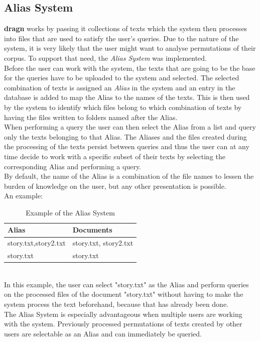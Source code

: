 \subsection{Alias System}
\label{sec:alias}
\textbf{dragn} works by passing it collections of texts which the system then processes into files that are used to satisfy the user's queries. Due to the nature of the system, it is very likely that the user might want to analyse permutations of their corpus. To support that need, the \textit{Alias System} was implemented.\\
Before the user can work with the system, the texts that are going to be the base for the queries have to be uploaded to the system and selected. The selected combination of texts is assigned an \textit{Alias} in the system and an entry in the database is added to map the Alias to the names of the texts. This is then used by the system to identify which files belong to which combination of texts by having the files written to folders named after the Alias.\\
When performing a query the user can then select the Alias from a list and query only the texts belonging to that Alias. The Aliases and the files created during the processing of the texts persist between queries and thus the user can at any time decide to work with a specific subset of their texts by selecting the corresponding Alias and performing a query.\\
By default, the name of the Alias is a combination of the file names to lessen the burden of knowledge on the user, but any other presentation is possible.\\
An example:
\begin{table}[h!]
\centering
\caption{Example of the Alias System}
\label{table:alias-example}
\begin{tabular}{l|l}
Alias & Documents \\ \hline
story.txt,story2.txt & story.txt, story2.txt \\
story.txt & story.txt
\end{tabular}
\end{table}
\\
In this example, the user can select "story.txt" as the Alias and perform queries on the processed files of the document "story.txt" without having to make the system process the text beforehand, because that has already been done.\\
The Alias System is especially advantageous when multiple users are working with the system. Previously processed permutations of texts created by other users are selectable as an Alias and can immediately be queried.\\

